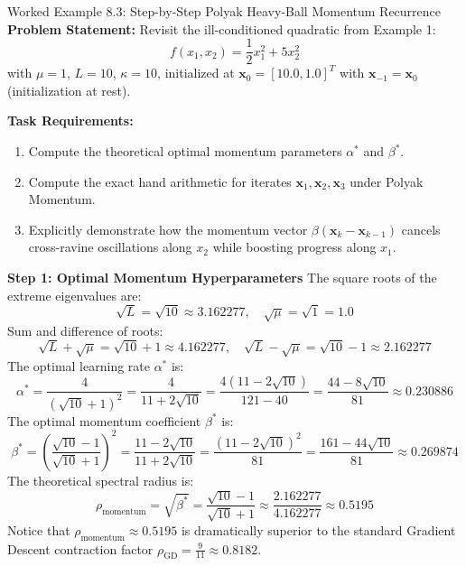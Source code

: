 \begin{examplebox}[breakable]{Worked Example 8.3: Step-by-Step Polyak Heavy-Ball Momentum Recurrence}
\textbf{Problem Statement:}
Revisit the ill-conditioned quadratic from Example 1:
\begin{equation}
f(x_1, x_2) = \frac{1}{2} x_1^2 + 5 x_2^2
\end{equation}
with $\mu = 1$, $L = 10$, $\kappa = 10$, initialized at $\mathbf{x}_0 = [10.0, 1.0]^T$ with $\mathbf{x}_{-1} = \mathbf{x}_0$ (initialization at rest).

\textbf{Task Requirements:}
\begin{enumerate}
    \item Compute the theoretical optimal momentum parameters $\alpha^*$ and $\beta^*$.
    \item Compute the exact hand arithmetic for iterates $\mathbf{x}_1, \mathbf{x}_2, \mathbf{x}_3$ under Polyak Momentum.
    \item Explicitly demonstrate how the momentum vector $\beta(\mathbf{x}_k - \mathbf{x}_{k-1})$ cancels cross-ravine oscillations along $x_2$ while boosting progress along $x_1$.
\end{enumerate}

\tcblower

\textbf{Step 1: Optimal Momentum Hyperparameters}
The square roots of the extreme eigenvalues are:
\begin{equation}
\sqrt{L} = \sqrt{10} \approx 3.162277, \quad \sqrt{\mu} = \sqrt{1} = 1.0
\end{equation}
Sum and difference of roots:
\begin{equation}
\sqrt{L} + \sqrt{\mu} = \sqrt{10} + 1 \approx 4.162277, \quad \sqrt{L} - \sqrt{\mu} = \sqrt{10} - 1 \approx 2.162277
\end{equation}
The optimal learning rate $\alpha^*$ is:
\begin{equation}
\alpha^* = \frac{4}{(\sqrt{10} + 1)^2} = \frac{4}{11 + 2\sqrt{10}} = \frac{4(11 - 2\sqrt{10})}{121 - 40} = \frac{44 - 8\sqrt{10}}{81} \approx 0.230886
\end{equation}
The optimal momentum coefficient $\beta^*$ is:
\begin{equation}
\beta^* = \left( \frac{\sqrt{10} - 1}{\sqrt{10} + 1} \right)^2 = \frac{11 - 2\sqrt{10}}{11 + 2\sqrt{10}} = \frac{(11 - 2\sqrt{10})^2}{81} = \frac{161 - 44\sqrt{10}}{81} \approx 0.269874
\end{equation}
The theoretical spectral radius is:
\begin{equation}
\rho_{\text{momentum}} = \sqrt{\beta^*} = \frac{\sqrt{10} - 1}{\sqrt{10} + 1} \approx \frac{2.162277}{4.162277} \approx 0.5195
\end{equation}
Notice that $\rho_{\text{momentum}} \approx 0.5195$ is dramatically superior to the standard Gradient Descent contraction factor $\rho_{\text{GD}} = \frac{9}{11} \approx 0.8182$.


\end{examplebox}
